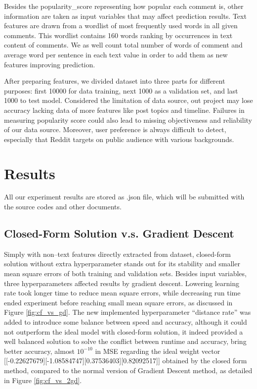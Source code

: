 \documentclass[letterpaper, 11pt]{article}
\begin{document}
Besides the popularity\_score representing how popular each comment is, other information are taken as input variables that may affect prediction results. Text features are drawn from a wordlist of most frequently used words in all given comments. This wordlist contains 160 words ranking by occurrences in text content of comments. We as well count total number of words of comment and average word per sentence in each text value in order to add them as new features improving prediction.

After preparing features, we divided dataset into three parts for different purposes: first 10000 for data training, next 1000 as a validation set, and last 1000 to test model. Considered the limitation of data source, out project may lose accuracy lacking data of more features like post topics and timeline. Failures in measuring popularity score could also lead to missing objectiveness and reliability of our data source. Moreover, user preference is always difficult to detect, especially that Reddit targets on public audience with various backgrounds.

\section*{Results}

All our experiment results are stored as .json file, which will be submitted with the source codes and other documents.

\subsection*{Closed-Form Solution v.s. Gradient Descent}

Simply with non\---text features directly extracted from dataset, closed-form solution without extra hyperparameter stands out for its stability and smaller mean square errors of both training and validation sets. Besides input variables, three hyperparameters affected results by gradient descent. Lowering learning rate took longer time to reduce mean square errors, while decreasing run time ended experiment before reaching small mean square errors, as discussed in Figure \ref{fig:cf_vs_gd}. The new implemented hyperparameter ``distance rate'' was added to introduce some balance between speed and accuracy, although it could not outperform the ideal model with closed-form solution, it indeed provided a well balanced solution to solve the conflict between runtime and accuracy, bring better accuracy, almost $ 10^{-10} $ in MSE regarding the ideal weight vector [[-0.22627679][-1.08584747][0.37536403][0.82092517]] obtained by the closed form method, compared to the normal version of Gradient Descent method, as detailed in Figure \ref{fig:cf_vs_2gd}.
\end{document}
